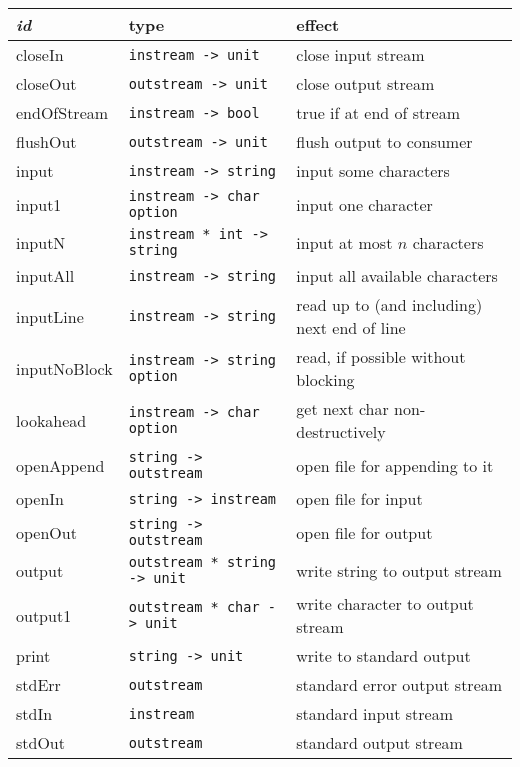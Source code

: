 \documentclass[fleqn]{article}
\begin{document}
\begin{tabular}{@{\tt\ \ }lll}\hline
{\it id\/}  &  type &     effect \\\hline

closeIn       & {\tt instream -> unit}  
        & close input stream\\
closeOut      & {\tt outstream -> unit}
        & close output stream\\
endOfStream  & {\tt instream -> bool}
        & true if at end of stream\\
flushOut     & {\tt outstream -> unit}
        & flush output to consumer\\
input         & {\tt instream -> string}
        & input some characters\\
input1         & {\tt instream -> char option}
        & input one character\\
inputN         & {\tt instream * int -> string}
        & input at most $n$ characters\\
inputAll         & {\tt instream -> string} 
        & input all available characters\\
inputLine    & {\tt instream -> string}
        & read up to (and including) next end of line\\
inputNoBlock    & {\tt instream -> string option}
        & read, if possible without blocking\\
lookahead      & {\tt instream -> char option} 
        & get next char non-destructively\\
openAppend   & {\tt string -> outstream} 
        & open file for appending to it\\
openIn       & {\tt string -> instream}
        & open file for input\\
openOut      & {\tt string -> outstream} 
        & open file for output\\
output         & {\tt outstream * string -> unit}   
        & write string to output stream\\
output1        & {\tt outstream * char -> unit}
        & write character to output stream\\
print   & {\tt string -> unit} 
        & write to standard output\\ 
stdErr       & {\tt outstream} 
        & standard error output stream\\
stdIn        & {\tt instream} 
        & standard input stream\\
stdOut       & {\tt outstream} 
        & standard output stream\\
\hline
\end{tabular}
\end{document}
